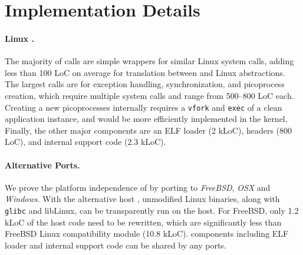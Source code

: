 \section{Implementation Details}
\label{sec:impl}

\paragraph{Linux \pal{}.}
The majority of \pal{} calls are simple wrappers for similar Linux system calls, 
adding less than 100 LoC on average for translation between \pal{} and Linux abstractions.
The largest \pal{} calls are for exception handling, synchronization, and picoprocess
creation, which require multiple system calls and range from 500--800 LoC each.
Creating a new picoprocesses internally requires a {\tt vfork} and {\tt exec} of a clean 
application instance, and would be more efficiently implemented in the kernel.
Finally, the other major \pal{} components are an ELF loader (2 kLoC), headers (800 LoC),
and internal support code (2.3 kLoC).

\paragraph{Alternative \pal{} Ports.}
We prove the platform independence of \sysname{}
by porting \pal{} to {\em FreeBSD}, {\em OSX} and {\em Windows}.
With the alternative host \pal{}, unmodified Linux binaries,
along with {\tt glibc} and {libLinux},
can be transparently run on the host.
For FreeBSD,
only 1.2 kLoC of the host \pal{} code need to be rewritten,
which are significantly less than FreeBSD Linux compatibility module (10.8 kLoC).
\pal{} components including ELF loader and internal support code can be shared by any \pal{} ports.


